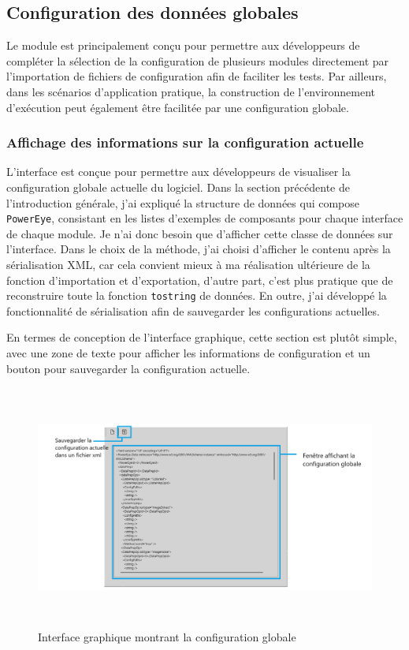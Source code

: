 \subsection{Configuration des données globales}
Le module est principalement conçu pour permettre aux développeurs de compléter la sélection de la configuration de plusieurs modules directement par l'importation de fichiers de configuration afin de faciliter les tests. Par ailleurs, dans les scénarios d'application pratique, la construction de l'environnement d'exécution peut également être facilitée par une configuration globale.

\subsubsection{Affichage des informations sur la configuration actuelle}
L'interface est conçue pour permettre aux développeurs de visualiser la configuration globale actuelle du logiciel. Dans la section précédente de l'introduction générale, j'ai expliqué la structure de données qui compose \texttt{PowerEye}, consistant en les listes d'exemples de composants pour chaque interface de chaque module. Je n'ai donc besoin que d'afficher cette classe de données sur l'interface. Dans le choix de la méthode, j'ai choisi d'afficher le contenu après la sérialisation \gls{XML}, car cela convient mieux à ma réalisation ultérieure de la fonction d'importation et d'exportation, d'autre part, c'est plus pratique que de reconstruire toute la fonction \texttt{tostring} de données. En outre, j'ai développé la fonctionnalité de sérialisation afin de sauvegarder les configurations actuelles. 

En termes de conception de l'interface graphique, cette section est plutôt simple, avec une zone de texte pour afficher les informations de configuration et un bouton pour sauvegarder la configuration actuelle.
\begin{figure}[H]
    \centering
    \includegraphics[height=8cm]{ressources/images/global_configuration.png}
    \caption{Interface graphique montrant la configuration globale}
\end{figure}

